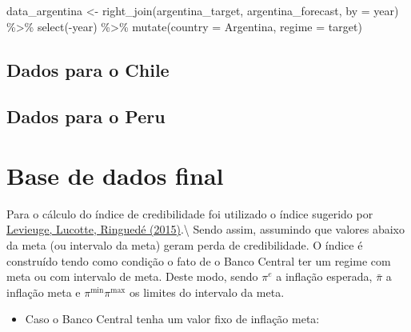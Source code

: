 \documentclass[
]{article}
\newenvironment{Shaded}{\begin{snugshade}}{\end{snugshade}}
\newcommand{\AttributeTok}[1]{\textcolor[rgb]{0.77,0.63,0.00}{#1}}
\newcommand{\FunctionTok}[1]{\textcolor[rgb]{0.00,0.00,0.00}{#1}}
\newcommand{\NormalTok}[1]{#1}
\newcommand{\OtherTok}[1]{\textcolor[rgb]{0.56,0.35,0.01}{#1}}
\newcommand{\SpecialCharTok}[1]{\textcolor[rgb]{0.00,0.00,0.00}{#1}}
\newcommand{\StringTok}[1]{\textcolor[rgb]{0.31,0.60,0.02}{#1}}
\providecommand{\tightlist}{%
  \setlength{\itemsep}{0pt}\setlength{\parskip}{0pt}}
\begin{document}
\begin{Shaded}
\begin{Highlighting}[]
\NormalTok{data\_argentina }\OtherTok{\textless{}{-}} \FunctionTok{right\_join}\NormalTok{(argentina\_target, argentina\_forecast, }\AttributeTok{by =} \StringTok{\textquotesingle{}year\textquotesingle{}}\NormalTok{) }\SpecialCharTok{\%\textgreater{}\%} 
  \FunctionTok{select}\NormalTok{(}\SpecialCharTok{{-}}\NormalTok{year) }\SpecialCharTok{\%\textgreater{}\%} 
  \FunctionTok{mutate}\NormalTok{(}\AttributeTok{country =} \StringTok{\textquotesingle{}Argentina\textquotesingle{}}\NormalTok{, }
         \AttributeTok{regime =} \StringTok{\textquotesingle{}target\textquotesingle{}}\NormalTok{)}
\end{Highlighting}
\end{Shaded}

\hypertarget{dados-para-o-chile}{%
\subsection{Dados para o Chile}\label{dados-para-o-chile}}

\hypertarget{dados-para-o-peru}{%
\subsection{Dados para o Peru}\label{dados-para-o-peru}}

\hypertarget{base-de-dados-final}{%
\section{Base de dados final}\label{base-de-dados-final}}

Para o cálculo do índice de credibilidade foi utilizado o índice
sugerido por
\href{https://econpapers.repec.org/paper/nbpnbpmis/209.htm}{Levieuge,
Lucotte, Ringuedé (2015)}.\textbackslash{} Sendo assim, assumindo que
valores abaixo da meta (ou intervalo da meta) geram perda de
credibilidade. O índice é construído tendo como condição o fato de o
Banco Central ter um regime com meta ou com intervalo de meta. Deste
modo, sendo \(\pi^e\) a inflação esperada, \(\bar{\pi}\) a inflação meta
e \(\pi^{\min} \pi^{\max}\) os limites do intervalo da meta.

\begin{itemize}
\tightlist
\item
  Caso o Banco Central tenha um valor fixo de inflação meta:
\end{itemize}
\end{document}
